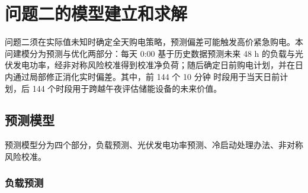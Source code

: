 \documentclass[withoutpreface,bwprint]{cumcmthesis}
\begin{document}

\section{问题二的模型建立和求解}

问题二须在实际值未知时确定全天购电策略，预测偏差可能触发高价紧急购电。本问建模分为预测与优化两部分：每天 0:00 基于历史数据预测未来 48 h 的负载与光伏发电功率，经非对称风险校准得到校准净负荷；随后确定日前购电计划，并在日内通过局部修正消化实时偏差。其中，前 144 个 10 分钟 时段用于当天日前计划，后 144 个时段用于跨越午夜评估储能设备的未来价值。

\vspace*{-5pt}
\subsection{预测模型}

预测模型分为四个部分，负载预测、光伏发电功率预测、冷启动处理办法、非对称风险校准。

\subsubsection{负载预测}
\end{document}
